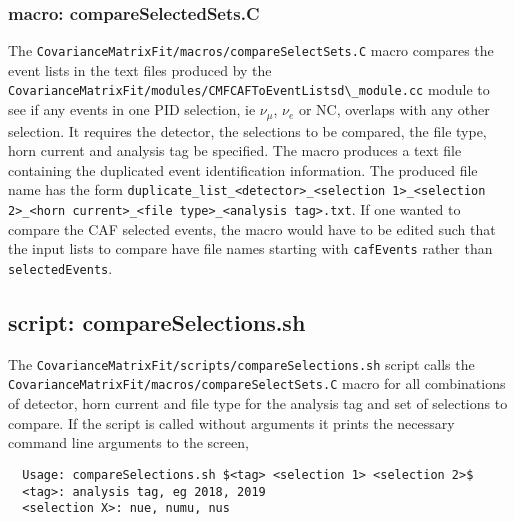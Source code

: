 \subsubsection{macro: compareSelectedSets.C}

The \lstinline{CovarianceMatrixFit/macros/compareSelectSets.C} macro compares the event lists in the text files produced by the \lstinline{CovarianceMatrixFit/modules/CMFCAFToEventListsd\_module.cc} module to see if any events in one PID selection, ie $\nu_{\mu}$, $\nu_{e}$ or NC, overlaps with any other selection.  It requires the detector, the selections to be compared, the file type, horn current and analysis tag be specified.  The macro produces a text file containing the duplicated event identification information.  The produced file name has the form \lstinline{duplicate_list_<detector>_<selection 1>_<selection 2>_<horn current>_<file type>_<analysis tag>.txt}.  If one wanted to compare the CAF selected events, the macro would have to be edited such that the input lists to compare have file names starting with \lstinline{cafEvents} rather than \lstinline{selectedEvents}.

\subsection{script: compareSelections.sh}

The \lstinline{CovarianceMatrixFit/scripts/compareSelections.sh} script calls the \lstinline{CovarianceMatrixFit/macros/compareSelectSets.C} macro for all combinations of detector, horn current and file type for the analysis tag and set of selections to compare. If the script is called without arguments it prints the necessary command line arguments to the screen,
\begin{lstlisting}
  Usage: compareSelections.sh $<tag> <selection 1> <selection 2>$
  <tag>: analysis tag, eg 2018, 2019
  <selection X>: nue, numu, nus
\end{lstlisting}
